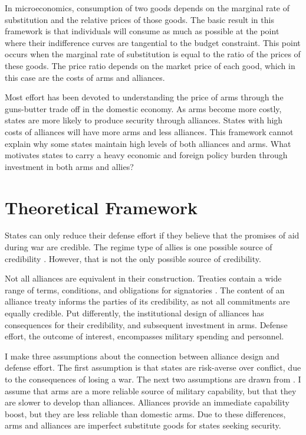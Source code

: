 \documentclass[12pt]{article}
\begin{document}
In microeconomics, consumption of two goods depends on the marginal rate of substitution and the relative prices of those goods. The basic result in this framework is that individuals will consume as much as possible at the point where their indifference curves are tangential to the budget constraint. This point occurs when the marginal rate of substitution is equal to the ratio of the prices of these goods. The price ratio depends on the market price of each good, which in this case are the costs of arms and alliances. 

Most effort has been devoted to understanding the price of arms through the guns-butter trade off in the domestic economy. As arms become more costly, states are more likely to produce security through alliances. States with high costs of alliances will have more arms and less alliances. This framework cannot explain why some states maintain high levels of both alliances and arms. What motivates states to carry a heavy economic and foreign policy burden through investment in both arms and allies? 

\section*{Theoretical Framework} 

States can only reduce their defense effort if they believe that the promises of aid during war are credible. The regime type of allies is one possible source of credibility \citep{DigiuseppePoast2016}. However, that is not the only possible source of credibility. 

Not all alliances are equivalent in their construction. Treaties contain a wide range of terms, conditions, and obligations for signatories \citep{Benson2011, Chibaetal2015}. The content of an alliance treaty informs the parties of its credibility, as not all commitments are equally credible. Put differently, the institutional design of alliances has consequences for their credibility, and subsequent investment in arms. Defense effort, the outcome of interest, encompasses military spending and personnel. 

I make three assumptions about the connection between alliance design and defense effort. The first assumption is that states are risk-averse over conflict, due to the consequences of losing a war. The next two assumptions are drawn from \citep{Morrow1993}. I assume that arms are a more reliable source of military capability, but that they are slower to develop than alliances. Alliances provide an immediate capability boost, but they are less reliable than domestic arms. Due to these differences, arms and alliances are imperfect substitute goods for states seeking security. 
\end{document}
